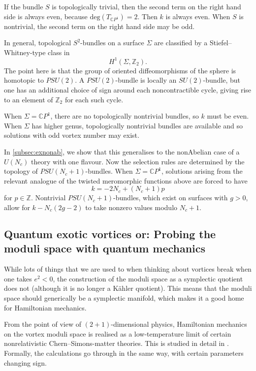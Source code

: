 \documentclass[10pt]{article}
\theoremstyle{definition}
\begin{document}
If the bundle \(S\) is topologically trivial, then the second term on the right hand side is always even, because \(\text{deg} (T_{\mathbb{C}P^1}) =2\). Then \(k\) is always even. When \(S\) is nontrivial, the second term on the right hand side may be odd.

In general, topological \(S^2\)-bundles on a surface \(\Sigma\) are classified by a Stiefel--Whitney-type class in
\[
H^1(\Sigma, \mathbb{Z}_2)\text{.}
\]
The point here is that the group of oriented diffeomorphisms of the sphere is homotopic to \(PSU(2)\). A \(PSU(2)\)-bundle is locally an \(SU(2)\)-bundle, but one has an additional choice of sign around each noncontractible cycle, giving rise to an element of \(\mathbb{Z}_2\) for each such cycle.

When \(\Sigma = \mathbb{C}P^1\), there are no topologically nontrivial bundles, so \(k\) must be even. When \(\Sigma\) has higher genus, topologically nontrivial bundles are available and so solutions with odd vortex number may exist.

In \autoref{subsec:exnonab}, we show that this generalises to the nonAbelian case of a \(U(N_c)\) theory with one flavour. Now the selection rules are determined by the topology of \(PSU(N_c+1)\)-bundles. When \(\Sigma = \mathbb{C}P^1\), solutions arising from the relevant analogue of the twisted meromorphic functions above are forced to have
\[
k = -2N_c + (N_c+1)p
\]
for \(p \in \mathbb{Z}\). Nontrivial \(PSU(N_c+1)\)-bundles, which exist on surfaces with \(g>0\), allow for \(k - N_c(2g-2)\) to take nonzero values modulo \(N_c+1\).


\subsection{Quantum exotic vortices or: Probing the moduli space with quantum mechanics}

While lots of things that we are used to when thinking about vortices break when one takes \(e^2 < 0\), the construction of the moduli space as a symplectic quotient does not (although it is no longer a K\"ahler quotient). This means that the moduli space should generically be a symplectic manifold, which makes it a good home for Hamiltonian mechanics. 


From the point of view of \((2+1)\)-dimensional physics, Hamiltonian mechanics on the vortex moduli space is realised as a low-temperature limit of certain nonrelativistic Chern--Simons-matter theories. This is studied in detail in \cite{waltonVC}. Formally, the calculations go through in the same way, with certain parameters changing sign. 
\end{document}
